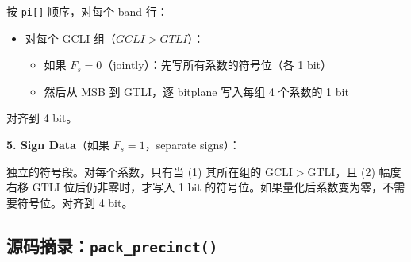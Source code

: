 按 \texttt{pi[]} 顺序，对每个 band 行：
\begin{itemize}
  \item 对每个 GCLI 组（$\mathit{GCLI} > \mathit{GTLI}$）：
    \begin{itemize}
      \item 如果 $F_s = 0$（jointly）：先写所有系数的符号位（各 1 bit）
      \item 然后从 MSB 到 GTLI，逐 bitplane 写入每组 4 个系数的 1 bit
    \end{itemize}
\end{itemize}

对齐到 4 bit。

\textbf{5. Sign Data}（如果 $F_s = 1$，separate signs）：

独立的符号段。对每个系数，只有当 (1) 其所在组的 $\mathrm{GCLI} > \mathrm{GTLI}$，且 (2) 幅度右移 $\mathrm{GTLI}$ 位后仍非零时，才写入 1 bit 的符号位。如果量化后系数变为零，不需要符号位。对齐到 4 bit。

\subsection{源码摘录：\texttt{pack\_precinct()}}

